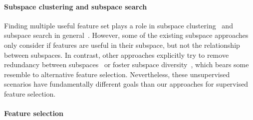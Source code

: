 \documentclass{article}
\theoremstyle{definition}
\begin{document}
\paragraph{Subspace clustering and subspace search}

Finding multiple useful feature set plays a role in subspace clustering~\cite{mueller2009relevant, guan2011unified, hu2018subspace} and subspace search in general~\cite{nguyen20134s, trittenbach2019dimension, fouche2021efficient}.
However, some of the existing subspace approaches only consider if features are useful in their subspace, but not the relationship between subspaces.
In contrast, other approaches explicitly try to remove redundancy between subspaces~\cite{mueller2009relevant, nguyen20134s} or foster subspace diversity~\cite{trittenbach2019dimension, fouche2021efficient}, which bears some resemble to alternative feature selection.
Nevertheless, these unsupervised scenarios have fundamentally different goals than our approaches for supervised feature selection.

\paragraph{Feature selection}
\end{document}
